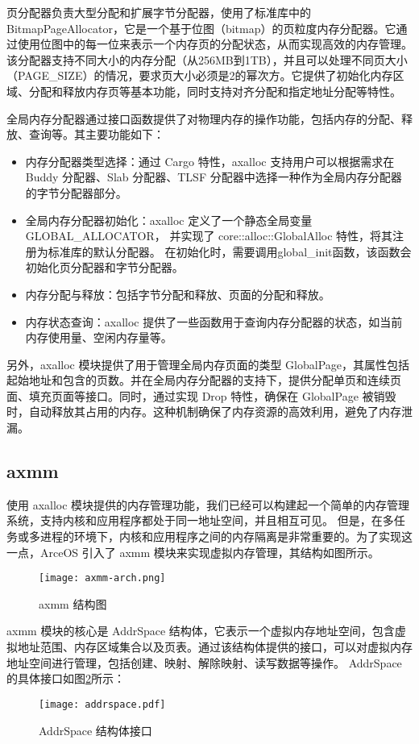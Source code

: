页分配器负责大型分配和扩展字节分配器，使用了标准库中的 BitmapPageAllocator，它是一个基于位图（bitmap）的页粒度内存分配器。它通过使用位图中的每一位来表示一个内存页的分配状态，从而实现高效的内存管理。该分配器支持不同大小的内存分配（从256MB到1TB），并且可以处理不同页大小（PAGE\_SIZE）的情况，要求页大小必须是2的幂次方。它提供了初始化内存区域、分配和释放内存页等基本功能，同时支持对齐分配和指定地址分配等特性。

全局内存分配器通过接口函数提供了对物理内存的操作功能，包括内存的分配、释放、查询等。其主要功能如下：
\begin{itemize}
\item 内存分配器类型选择：通过 Cargo 特性，axalloc 支持用户可以根据需求在 Buddy 分配器、Slab 分配器、TLSF 分配器中选择一种作为全局内存分配器的字节分配器部分。
\item 全局内存分配器初始化：axalloc 定义了一个静态全局变量 GLOBAL\_ALLOCATOR，
并实现了 core::alloc::GlobalAlloc 特性，将其注册为标准库的默认分配器。
在初始化时，需要调用global\_init函数，该函数会初始化页分配器和字节分配器。
\item 内存分配与释放：包括字节分配和释放、页面的分配和释放。
\item 内存状态查询：axalloc 提供了一些函数用于查询内存分配器的状态，如当前内存使用量、空闲内存量等。
\end{itemize}

另外，axalloc 模块提供了用于管理全局内存页面的类型 GlobalPage，其属性包括起始地址和包含的页数。并在全局内存分配器的支持下，提供分配单页和连续页面、填充页面等接口。同时，通过实现 Drop 特性，确保在 GlobalPage 被销毁时，自动释放其占用的内存。这种机制确保了内存资源的高效利用，避免了内存泄漏。

\subsection{axmm}

使用 axalloc 模块提供的内存管理功能，我们已经可以构建起一个简单的内存管理系统，支持内核和应用程序都处于同一地址空间，并且相互可见。
但是，在多任务或多进程的环境下，内核和应用程序之间的内存隔离是非常重要的。为了实现这一点，ArceOS 引入了 axmm 模块来实现虚拟内存管理，其结构如图所示。

\begin{figure}
  \centering
  \texttt{[image: axmm-arch.png]}
  \caption{axmm 结构图}
  \label{fig:axmm-arch}
\end{figure}


axmm 模块的核心是 AddrSpace 结构体，它表示一个虚拟内存地址空间，包含虚拟地址范围、内存区域集合以及页表。通过该结构体提供的接口，可以对虚拟内存地址空间进行管理，包括创建、映射、解除映射、读写数据等操作。
AddrSpace 的具体接口如图\ref{fig:AddrSpace}所示：
\begin{figure}
    \centering
    \texttt{[image: addrspace.pdf]}
    \caption{AddrSpace 结构体接口}
    \label{fig:AddrSpace}
\end{figure}

